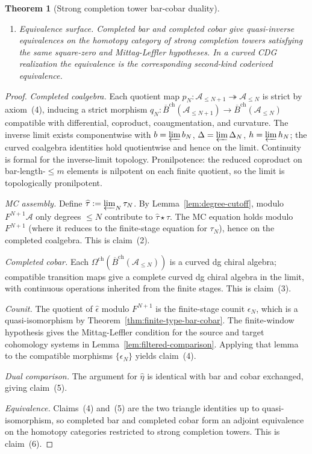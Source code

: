 \documentclass[11pt,reqno]{amsart}
\newtheorem{theorem}{Theorem}[section]
\theoremstyle{definition}
\theoremstyle{remark}
\newcommand{\cA}{\mathcal{A}}
\newcommand{\cC}{\mathcal{C}}
\newcommand{\barB}{\overline{B}}
\numberwithin{equation}{section}
\begin{document}
\begin{theorem}[Strong completion tower bar-cobar duality]
\begin{enumerate}
	 completed unit
 \[
 \widehat\eta\colon \cC \xrightarrow{\ \sim\ }
 \widehat{\barB}^{\mathrm{ch}}\bigl(
 \widehat{\Omega}^{\mathrm{ch}}(\cC)\bigr)
 \]
	 is a quasi-isomorphism in the square-zero total model, with
	 the curved CDG version read as a coacyclic-cone comparison.
\item \emph{Equivalence surface.} Completed bar and completed
	 cobar give quasi-inverse equivalences on the homotopy category
	 of strong completion towers satisfying the same square-zero
	 and Mittag-Leffler hypotheses. In a curved CDG realization the
	 equivalence is the corresponding second-kind coderived
	 equivalence.
\end{enumerate}
\end{theorem}

\begin{proof}
\emph{Completed coalgebra.}
Each quotient map $p_N\colon \cA_{\le N+1} \twoheadrightarrow
\cA_{\le N}$ is strict by axiom~(4), inducing a strict
morphism
$q_N\colon \barB^{\mathrm{ch}}(\cA_{\le N+1}) \to
\barB^{\mathrm{ch}}(\cA_{\le N})$
compatible with differential, coproduct, coaugmentation, and
curvature. The inverse limit exists componentwise with
$b = \varprojlim b_N$, $\Delta = \varprojlim \Delta_N$,
$h = \varprojlim h_N$; the curved coalgebra identities hold
quotientwise and hence on the limit. Continuity is formal for
the inverse-limit topology. Pronilpotence: the reduced
coproduct on bar-length-$\le m$ elements is nilpotent on each
finite quotient, so the limit is topologically pronilpotent.

\emph{MC assembly.} Define
$\widehat\tau := \varprojlim_N \tau_N$. By
Lemma~\ref{lem:degree-cutoff}, modulo $F^{N+1}\cA$ only degrees
$\le N$ contribute to $\widehat\tau \star \widehat\tau$. The
MC equation holds modulo $F^{N+1}$ (where it reduces to the
finite-stage equation for $\tau_N$), hence on the completed
coalgebra. This is claim~(2).

\emph{Completed cobar.} Each
$\Omega^{\mathrm{ch}}(\barB^{\mathrm{ch}}(\cA_{\le N}))$ is
a curved dg chiral algebra; compatible transition maps give a
complete curved dg chiral algebra in the limit, with continuous
operations inherited from the finite stages. This is claim~(3).

\emph{Counit.} The quotient of
$\widehat\epsilon$ modulo $F^{N+1}$ is the finite-stage counit
$\epsilon_N$, which is a quasi-isomorphism by
Theorem~\ref{thm:finite-type-bar-cobar}. The finite-window
hypothesis gives the Mittag-Leffler condition for the source
and target cohomology systems in Lemma~\ref{lem:filtered-comparison}.
Applying that lemma to the compatible morphisms
$\{\epsilon_N\}$ yields claim~(4).

\emph{Dual comparison.} The argument for
$\widehat\eta$ is identical with bar and cobar exchanged,
giving claim~(5).

\emph{Equivalence.} Claims~(4) and~(5)
are the two triangle identities up to quasi-isomorphism, so
completed bar and completed cobar form an adjoint equivalence
on the homotopy categories restricted to strong completion
towers. This is claim~(6).
\end{proof}
\end{document}
